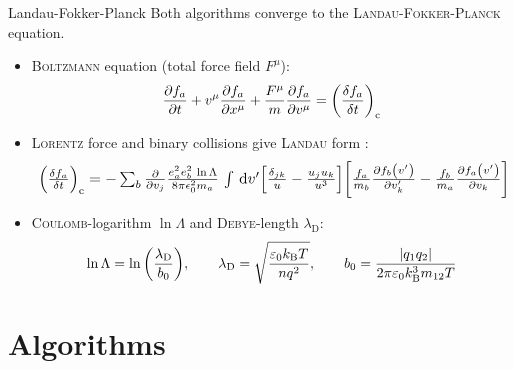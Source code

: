 \begin{frame}{Landau-Fokker-Planck}
    Both algorithms converge to the \textsc{Landau-Fokker-Planck} equation.
    \begin{itemize}
        \item \textsc{Boltzmann} equation \cite[1]{Rosenbluth1957} (total force field $F^\mu$):
        \begin{equation*}
            \pdv{f_a}{t} + v^\mu \pdv{f_a}{x^\mu} + \frac{F^\mu}{m} \pdv{f_a}{v^\mu} = \qty(\fdv{f_a}{t})_\mathrm{c}
        \end{equation*}

        \item \textsc{Lorentz} force and binary collisions give \textsc{Landau} form \cite{Wang2008}:
        \begin{equation*}
        \resizebox{\hsize}{!}{
            $\qty(\fdv{f_a}{t})_\mathrm{c} = - \sum_b \pdv{v_j} \frac{e_a^2 e_b^2 \,\ln\Lambda}{8 \pi \epsilon_0^2 m_a} \, \int \, \dd v^\prime \qty[\frac{\delta_{jk}}{u} - \frac{u_j u_k}{u^3}] \qty[\frac{f_a}{m_b} \pdv{f_b\qty(v^\prime)}{v_k^\prime} - \frac{f_b}{m_a} \pdv{f_a\qty(v^\prime)}{v_k}]$
        }
        \end{equation*}

        \item \textsc{Coulomb}-logarithm $\ln\Lambda$ and \textsc{Debye}-length $\lambda_\mathrm{D}$:
        \begin{equation*}
            \ln\Lambda = \ln\qty(\frac{\lambda_\mathrm{D}}{b_0}) ,
            \qquad
            \lambda_\mathrm{D} = \sqrt{\frac{\varepsilon_0 k_\mathrm{B} T}{n q^2}} ,
            \qquad
            b_0 = \frac{\qty|q_1q_2|}{2 \pi \varepsilon_0 k_\mathrm{B}^3 m_{12} T}
        \end{equation*}
    \end{itemize}
\end{frame}


\section{Algorithms}

